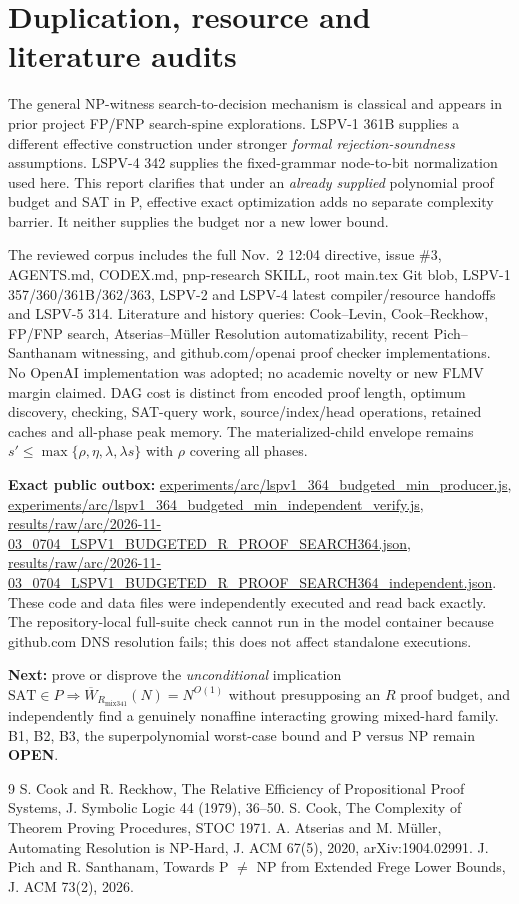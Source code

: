 \documentclass[11pt]{article}
\begin{document}
\section*{Duplication, resource and literature audits}
The general NP-witness search-to-decision mechanism is classical and appears in prior project FP/FNP search-spine explorations. LSPV-1 361B supplies a different effective construction under stronger \emph{formal rejection-soundness} assumptions. LSPV-4 342 supplies the fixed-grammar node-to-bit normalization used here. This report clarifies that under an \emph{already supplied} polynomial proof budget and SAT in P, effective exact optimization adds no separate complexity barrier. It neither supplies the budget nor a new lower bound.

The reviewed corpus includes the full Nov.\ 2 12:04 directive, issue \#3, AGENTS.md, CODEX.md, pnp-research SKILL, root main.tex Git blob, LSPV-1 357/360/361B/362/363, LSPV-2 and LSPV-4 latest compiler/resource handoffs and LSPV-5 314. Literature and history queries: Cook--Levin, Cook--Reckhow, FP/FNP search, Atserias--M\"uller Resolution automatizability, recent Pich--Santhanam witnessing, and github.com/openai proof checker implementations. No OpenAI implementation was adopted; no academic novelty or new FLMV margin claimed. DAG cost is distinct from encoded proof length, optimum discovery, checking, SAT-query work, source/index/head operations, retained caches and all-phase peak memory. The materialized-child envelope remains $s'\le\max\{\rho,\eta,\lambda,\lambda s\}$ with $\rho$ covering all phases.

\textbf{Exact public outbox:}
\url{experiments/arc/lspv1_364_budgeted_min_producer.js},
\url{experiments/arc/lspv1_364_budgeted_min_independent_verify.js},
\url{results/raw/arc/2026-11-03_0704_LSPV1_BUDGETED_R_PROOF_SEARCH364.json},
\url{results/raw/arc/2026-11-03_0704_LSPV1_BUDGETED_R_PROOF_SEARCH364_independent.json}.
These code and data files were independently executed and read back exactly. The repository-local full-suite check cannot run in the model container because github.com DNS resolution fails; this does not affect standalone executions.

\textbf{Next:} prove or disprove the \emph{unconditional} implication $\mathrm{SAT}\in P\Rightarrow\overline W_{R_{\mathrm{mix341}}}(N)=N^{O(1)}$ without presupposing an $R$ proof budget, and independently find a genuinely nonaffine interacting growing mixed-hard family. B1, B2, B3, the superpolynomial worst-case bound and P versus NP remain \textbf{OPEN}.
\begin{thebibliography}{9}
 S. Cook and R. Reckhow, The Relative Efficiency of Propositional Proof Systems, J. Symbolic Logic 44 (1979), 36--50.
 S. Cook, The Complexity of Theorem Proving Procedures, STOC 1971.
 A. Atserias and M. M\"uller, Automating Resolution is NP-Hard, J. ACM 67(5), 2020, arXiv:1904.02991.
 J. Pich and R. Santhanam, Towards P $\ne$ NP from Extended Frege Lower Bounds, J. ACM 73(2), 2026.
\end{thebibliography}
\end{document}
